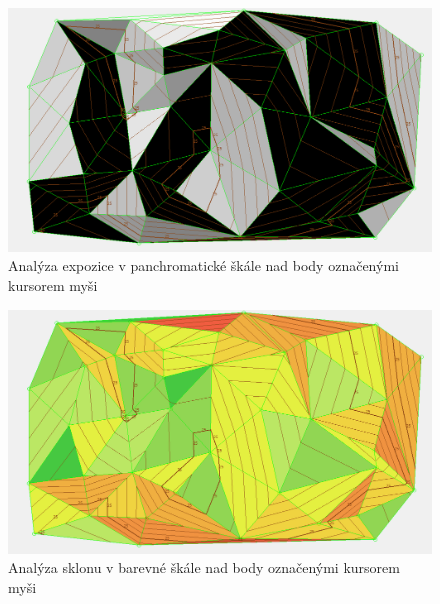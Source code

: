 \documentclass[a4paper,11pt,twoside]{article}
\begin{document}
\begin{figure}[hbt!] 
\begin{center}
\includegraphics[width=15cm]{pictures/dtm_panchromatic_aspect.PNG} 
\caption[Analýza expozice v panchromatické škále nad body označenými kursorem myši]{Analýza expozice v panchromatické škále nad body označenými kursorem myši}
\label{fig:dtm_panchromatic_aspect}
\end{center}
\end{figure}

\begin{figure}[hbt!] 
\begin{center}
\includegraphics[width=15cm]{pictures/dtm_colorful_slope.PNG} 
\caption[Analýza sklonu v barevné škále nad body označenými kursorem myši]{Analýza sklonu v barevné škále nad body označenými kursorem myši}
\label{fig:dtm_colorful_slope}
\end{center}
\end{figure}
\end{document}
